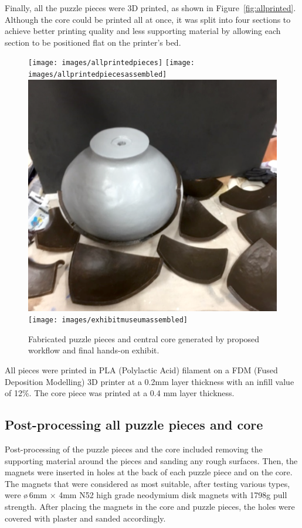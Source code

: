 \documentclass[acmlarge,screen,dvipsnames]{acmart}
\begin{document}
Finally, all the puzzle pieces were 3D printed, as shown in
Figure~\ref{fig:allprinted}. Although the core could be printed all at
once, it was split into four sections to achieve better printing
quality and less supporting material by allowing each section to be
positioned flat on the printer's bed.

\begin{figure}[htb]
  \centering
  {\texttt{[image: images/allprintedpieces]}}
  {\texttt{[image: images/allprintedpiecesassembled]}}\\
   {\includegraphics[width=0.4299\linewidth]{images/painting}}
  {\texttt{[image: images/exhibitmuseumassembled]}}
    \caption{Fabricated puzzle pieces and central core generated by proposed workflow and final hands-on exhibit.}
\end{figure}

All pieces were printed in PLA (Polylactic Acid) filament on a FDM
(Fused Deposition Modelling) 3D printer at a 0.2mm layer thickness
with an infill value of 12\%. The core piece was printed at a 0.4 mm
layer thickness.


\subsection{Post-processing all puzzle pieces and core}

Post-processing of the puzzle pieces and the core included removing
the supporting material around the pieces and sanding any rough
surfaces. Then, the magnets were inserted in holes at the back of each
puzzle piece and on the core. The magnets that were considered as most
suitable, after testing various types, were \o\,6mm$\,\times\,$4mm N52
high grade neodymium disk magnets with 1798g pull strength. After
placing the magnets in the core and puzzle pieces, the holes were
covered with plaster and sanded accordingly.
\end{document}
